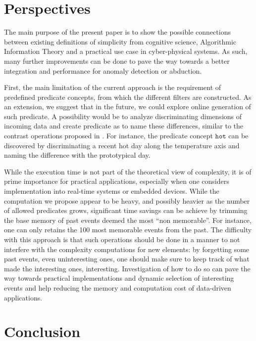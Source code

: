 \documentclass[conference]{IEEEtran}
\begin{document}
\section{Perspectives}
\label{sec:future}
The main purpose of the present paper is to show the possible connections
between existing definitions of simplicity from cognitive science, Algorithmic
Information Theory and a practical use case in cyber-physical systems. As such,
many further improvements can be done to pave the way towards a better
integration and performance for anomaly detection or abduction.

First, the main limitation of the current approach is the requirement of
predefined predicate concepts, from which the different filters are constructed.
As an extension, we suggest that in the future, we could explore online
generation of such predicate. A possibility would be to analyze discriminating
dimensions of incoming data and create predicate as to name these differences,
similar to the contrast operations proposed in \cite{dessalles_conceptual_2015,
  gardenfors2004conceptual}. For instance, the predicate concept $\mathtt{hot}$
can be discovered by discriminating a recent hot day along the
temperature axis and naming the difference with the prototypical day.

While the execution time is not part of the theoretical view of complexity, it
is of prime importance for practical applications, especially when one considers
implementation into real-time systems or embedded devices. While the computation
we propose appear to be heavy, and possibly heavier as the number of allowed
predicates grows, significant time savings can be achieve by trimming the base
memory of past events deemed the most ``non memorable''. For instance, one can
only retains the 100 most memorable events from the past. The difficulty with
this approach is that such operations should be done in a manner to not
interfere with the complexity computations for new elements: by forgetting some
past events, even uninteresting ones, one should make sure to keep track of what
made the interesting ones, interesting. Investigation of how to do so can pave
the way towards practical implementations and dynamic selection of interesting
events and help reducing the memory and computation cost of data-driven applications.


\section{Conclusion}




\end{document}
